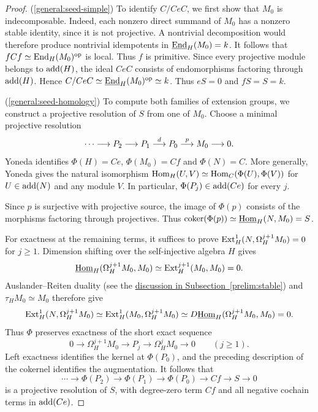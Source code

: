 \documentclass[11pt]{article}
\begin{document}
\begin{proof}
\textup{(\ref{general:seed-simple})} To identify $C/CeC$, we first show that $M_0$ is
indecomposable. Indeed, each nonzero direct summand of $M_0$ has a nonzero stable identity, since it is
not projective. A nontrivial decomposition would therefore produce
nontrivial idempotents in $\underline{{\rm End}}_H(M_0)=k$.  It follows that
$fCf\simeq {\rm End}_H(M_0)^{\mathrm{op}}$ is local. Thus $f$ is primitive.
Since every projective module belongs to ${\rm add}(H)$, the ideal $CeC$
consists of endomorphisms factoring through ${\rm add}(H)$. Hence
$C/CeC\simeq\underline{{\rm End}}_H(M_0)^{\mathrm{op}}\simeq k$.
Thus $eS=0$ and $fS=S=k$.

\textup{(\ref{general:seed-homology})} To compute both families of extension groups, we construct
a projective resolution of $S$ from one of $M_0$.
Choose a minimal projective resolution
\[
 \cdots\longrightarrow P_2\longrightarrow P_1\stackrel{d}{\longrightarrow} P_0
 \stackrel{p}{\longrightarrow}M_0\longrightarrow 0.
\]
Yoneda identifies $\Phi(H)=Ce$, $\Phi(M_0)=Cf$ and $\Phi(N)=C$.
More generally, Yoneda gives the natural isomorphism
${\rm Hom}_H(U,V)\simeq{\rm Hom}_C(\Phi(U),\Phi(V))$ for $U\in{\rm add}(N)$ and any module $V$.
In particular, $\Phi(P_j)\in{\rm add}(Ce)$ for every $j$.

Since $p$ is surjective with projective source, the image of
$\Phi(p)$ consists of the morphisms factoring through projectives.
Thus $\operatorname{coker}(\Phi(p))\simeq\underline{{\rm Hom}}_H(N,M_0)=S$.

For exactness at the remaining terms, it suffices to prove
${\rm Ext}_H^1(N,\Omega_H^{j+1}M_0)=0$ for $j\ge1$.
Dimension shifting over the self-injective algebra $H$ gives
\[
 \underline{{\rm Hom}}_H(\Omega_H^{j+1}M_0,M_0)
 \simeq{\rm Ext}_H^{j+1}(M_0,M_0)=0.
\]
Auslander--Reiten duality (see the \hyperref[prelim:AR-duality]{discussion in Subsection~\ref*{prelim:stable}}) and
$\tau_HM_0\simeq M_0$ therefore give
\[
{\rm Ext}_H^1(N,\Omega_H^{j+1}M_0)\simeq  {\rm Ext}_H^1(M_0,\Omega_H^{j+1}M_0)
 \simeq D\underline{{\rm Hom}}_H(\Omega_H^{j+1}M_0,M_0)=0.
\]
Thus $\Phi$ preserves exactness of the short exact sequence
\[
 0\longrightarrow\Omega_H^{j+1}M_0\longrightarrow P_j
 \longrightarrow\Omega_H^jM_0\longrightarrow0
 \qquad(j\ge1).
\]
Left exactness identifies the kernel at $\Phi(P_0)$, and the preceding description of the cokernel identifies the augmentation.  It follows that
\begin{equation*}
 \cdots\longrightarrow\Phi(P_2)\longrightarrow\Phi(P_1)\longrightarrow\Phi(P_0)
 \longrightarrow Cf\longrightarrow S\longrightarrow0
\end{equation*}
is a projective resolution of $S$, with degree-zero term $Cf$ and
all negative cochain terms in ${\rm add}(Ce)$.


\end{proof}
\end{document}
